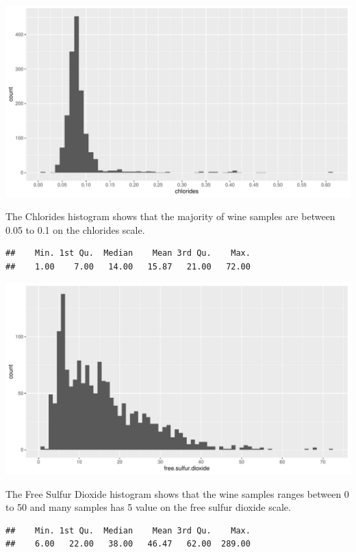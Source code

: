 \documentclass[]{article}
\begin{document}
\begin{center}\includegraphics{Figs/unnamed-chunk-5-1} \end{center}

The Chlorides histogram shows that the majority of wine samples are
between 0.05 to 0.1 on the chlorides scale.

\begin{verbatim}
##    Min. 1st Qu.  Median    Mean 3rd Qu.    Max. 
##    1.00    7.00   14.00   15.87   21.00   72.00
\end{verbatim}

\begin{center}\includegraphics{Figs/unnamed-chunk-6-1} \end{center}

The Free Sulfur Dioxide histogram shows that the wine samples ranges
between 0 to 50 and many samples has 5 value on the free sulfur dioxide
scale.

\begin{verbatim}
##    Min. 1st Qu.  Median    Mean 3rd Qu.    Max. 
##    6.00   22.00   38.00   46.47   62.00  289.00
\end{verbatim}
\end{document}
